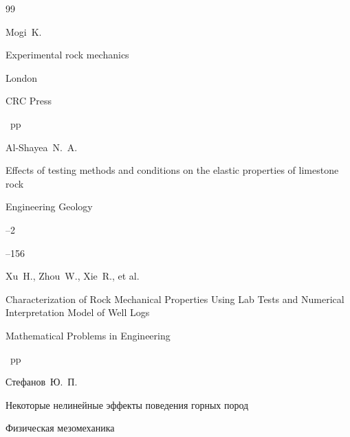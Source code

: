 \begin{thebibliography}{99}




\by Mogi~K.

\book Experimental rock mechanics


\publaddr London

\publ CRC Press 

~pp \nofrills





\by Al-Shayea~N.~A.

\paper Effects of testing methods and conditions on the elastic properties of limestone rock

\jour Engineering Geology



--2

--156






\by Xu~H., Zhou~W., Xie~R., et al.

\paper Characterization of Rock Mechanical Properties Using Lab Tests and Numerical Interpretation Model of Well Logs

\jour  Mathematical Problems in Engineering 





~pp \nofrills






\by Стефанов~Ю.~П.

\paper Некоторые нелинейные эффекты поведения горных пород

\jour Физическая мезомеханика



\end{thebibliography}
